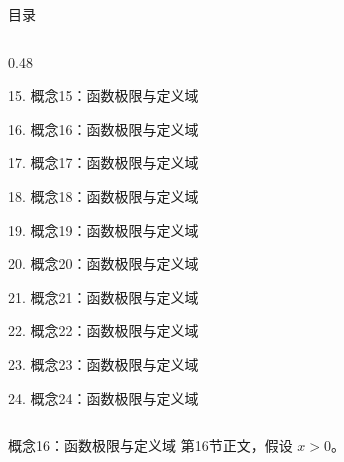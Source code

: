 \documentclass[aspectratio=169,10pt,fontset=fandol]{ctexbeamer}
\begin{document}
\begin{frame}[t,fragile]{目录}
\begin{columns}[T,onlytextwidth]
\begin{column}{0.48\textwidth}
{\color{black}\small 15. 概念15：函数极限与定义域\par}\vspace{0.22em}
{\color{blue}\small 16. 概念16：函数极限与定义域\par}\vspace{0.22em}
{\color{gray!40}\small 17. 概念17：函数极限与定义域\par}\vspace{0.22em}
{\color{gray!40}\small 18. 概念18：函数极限与定义域\par}\vspace{0.22em}
{\color{gray!40}\small 19. 概念19：函数极限与定义域\par}\vspace{0.22em}
{\color{gray!40}\small 20. 概念20：函数极限与定义域\par}\vspace{0.22em}
{\color{gray!40}\small 21. 概念21：函数极限与定义域\par}\vspace{0.22em}
{\color{gray!40}\small 22. 概念22：函数极限与定义域\par}\vspace{0.22em}
{\color{gray!40}\small 23. 概念23：函数极限与定义域\par}\vspace{0.22em}
{\color{gray!40}\small 24. 概念24：函数极限与定义域\par}\vspace{0.22em}
\end{column}
\end{columns}
\end{frame}
\begin{frame}[t,fragile]{概念16：函数极限与定义域}
\normalsize
{\normalsize
第16节正文，假设 $x>0$。
}
\end{frame}
\end{document}
